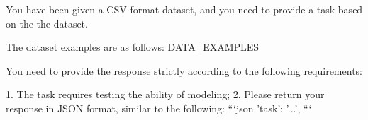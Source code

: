 \begin{tcolorbox}[colback=cadmiumgreen!5!white,colframe=forestgreen!75!white,breakable,title=\textit{Prompt for task construction in modeling.}]
\begin{VerbatimWrap}
You have been given a CSV format dataset, and you need to provide a task based on the the dataset.

The dataset examples are as follows:
{{DATA_EXAMPLES}}

You need to provide the response strictly according to the following requirements:

1. The task requires testing the ability of modeling;
2. Please return your response in JSON format, similar to the following:
```json
{
    'task': '...',
}
```
\end{VerbatimWrap}
\end{tcolorbox}
